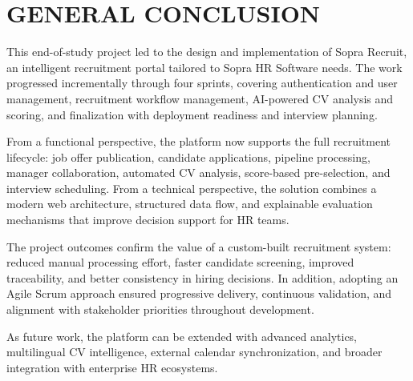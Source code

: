 ﻿\chapter*{GENERAL CONCLUSION}
\thispagestyle{MyStyle}

This end-of-study project led to the design and implementation of Sopra Recruit, an intelligent recruitment portal tailored to Sopra HR Software needs. The work progressed incrementally through four sprints, covering authentication and user management, recruitment workflow management, AI-powered CV analysis and scoring, and finalization with deployment readiness and interview planning.

From a functional perspective, the platform now supports the full recruitment lifecycle: job offer publication, candidate applications, pipeline processing, manager collaboration, automated CV analysis, score-based pre-selection, and interview scheduling. From a technical perspective, the solution combines a modern web architecture, structured data flow, and explainable evaluation mechanisms that improve decision support for HR teams.

The project outcomes confirm the value of a custom-built recruitment system: reduced manual processing effort, faster candidate screening, improved traceability, and better consistency in hiring decisions. In addition, adopting an Agile Scrum approach ensured progressive delivery, continuous validation, and alignment with stakeholder priorities throughout development.

As future work, the platform can be extended with advanced analytics, multilingual CV intelligence, external calendar synchronization, and broader integration with enterprise HR ecosystems.

